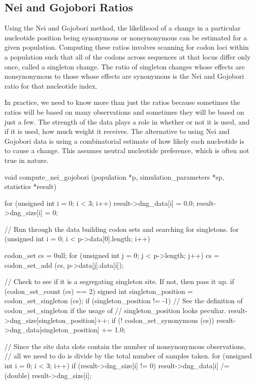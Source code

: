 \documentclass{article}
\begin{document}
    \subsection{Nei and Gojobori Ratios}
      \label{sec:nei-gojobori}

      Using the Nei and Gojobori method, the likelihood of a change in a
      particular nucleotide position being synonymous or nonsynonymous can be
      estimated for a given population. Computing these ratios involves scanning
      for codon loci within a population such that all of the codons across
      sequences at that locus differ only once, called a singleton change. The
      ratio of singleton changes whose effects are nonsynonymous to those whose
      effects are synonymous is the Nei and Gojobori ratio for that nucleotide
      index.

      In practice, we need to know more than just the ratios because sometimes
      the ratios will be based on many observations and sometimes they will be
      based on just a few. The strength of the data plays a role in whether or
      not it is used, and if it is used, how much weight it receives. The
      alternative to using Nei and Gojobori data is using a combinatorial
      estimate of how likely each nucleotide is to cause a change. This assumes
      neutral nucleotide preference, which is often not true in nature.

\begin{ccode}
void compute_nei_gojobori (population *p, simulation_parameters *sp, statistics *result) {
  for (unsigned int i = 0; i < 3; i++) {
    result->dng_data[i] = 0.0;
    result->dng_size[i] = 0;
  }

  // Run through the data building codon sets and searching for singletons.
  for (unsigned int i = 0; i < p->data[0].length; i++) {
    codon_set cs = 0ull;
    for (unsigned int j = 0; j < p->length; j++)
      cs = codon_set_add (cs, p->data[j].data[i]);

    // Check to see if it is a segregating singleton site. If not, then pass it up.
    if (codon_set_count (cs) == 2) {
      signed int singleton_position = codon_set_singleton (cs);
      if (singleton_position != -1) {
        // See the definition of codon_set_singleton if the usage of
        // singleton_position looks peculiar.
        result->dng_size[singleton_position]++;
        if (! codon_set_synonymous (cs))
         result->dng_data[singleton_position] += 1.0;
      }
    }
  }

  // Since the site data slots contain the number of nonsynonymous observations,
  // all we need to do is divide by the total number of samples taken.
  for (unsigned int i = 0; i < 3; i++)
    if (result->dng_size[i] != 0)
      result->dng_data[i] /= (double) result->dng_size[i];
}
\end{ccode}
\end{document}

